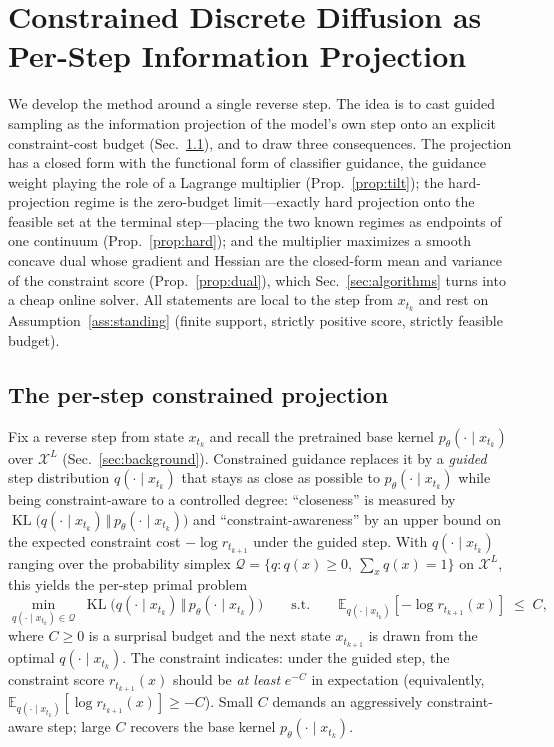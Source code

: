 \documentclass{article}
\DeclareMathOperator{\KL}{KL}
\newcommand{\E}{\mathbb{E}}
\newcommand{\X}{\mathcal{X}}
\newcommand{\Q}{\mathcal{Q}}
\begin{document}
\section{Constrained Discrete Diffusion as Per-Step Information Projection}
\label{sec:method}

We develop the method around a single reverse step. The idea is to cast guided sampling as the information projection of the model's own step onto an explicit constraint-cost budget (Sec.~\ref{sec:perstep}), and to draw three consequences. The projection has a closed form with the functional form of classifier guidance, the guidance weight playing the role of a Lagrange multiplier (Prop.~\ref{prop:tilt}); the hard-projection regime is the zero-budget limit---exactly hard projection onto the feasible set at the terminal step---placing the two known regimes as endpoints of one continuum (Prop.~\ref{prop:hard}); and the multiplier maximizes a smooth concave dual whose gradient and Hessian are the closed-form mean and variance of the constraint score (Prop.~\ref{prop:dual}), which Sec.~\ref{sec:algorithms} turns into a cheap online solver. All statements are local to the step from $x_{t_k}$ and rest on Assumption~\ref{ass:standing} (finite support, strictly positive score, strictly feasible budget).

\subsection{The per-step constrained projection}
\label{sec:perstep}
Fix a reverse step from state $x_{t_k}$ and recall the pretrained base kernel $p_\theta(\cdot\mid x_{t_k})$ over $\X^L$ (Sec.~\ref{sec:background}). Constrained guidance replaces it by a \emph{guided} step distribution $q(\cdot\mid x_{t_k})$ that stays as close as possible to $p_\theta(\cdot\mid x_{t_k})$ while being constraint-aware to a controlled degree: ``closeness'' is measured by $\KL\big(q(\cdot\mid x_{t_k})\,\Vert\,p_\theta(\cdot\mid x_{t_k})\big)$ and ``constraint-awareness'' by an upper bound on the expected constraint cost $-\log r_{t_{k+1}}$ under the guided step. With $q(\cdot\mid x_{t_k})$ ranging over the probability simplex $\Q=\{q:q(x)\ge0,\ \sum_x q(x)=1\}$ on $\X^L$, this yields the per-step primal problem
\begin{equation}
\label{eq:primal}
\min_{q(\cdot\mid x_{t_k})\in\Q}\; \KL\big(q(\cdot\mid x_{t_k})\,\big\Vert\, p_\theta(\cdot\mid x_{t_k})\big)
\qquad\text{s.t.}\qquad
\E_{q(\cdot\mid x_{t_k})}\!\left[-\log r_{t_{k+1}}(x)\right]\;\le\;C,
\end{equation}
where $C\ge 0$ is a surprisal budget and the next state $x_{t_{k+1}}$ is drawn from the optimal $q(\cdot\mid x_{t_k})$. The constraint indicates: under the guided step, the constraint score $r_{t_{k+1}}(x)$ should be \emph{at least} $e^{-C}$ in expectation (equivalently, $\E_{q(\cdot\mid x_{t_k})}[\log r_{t_{k+1}}(x)]\ge -C$). Small $C$ demands an aggressively constraint-aware step; large $C$ recovers the base kernel $p_\theta(\cdot\mid x_{t_k})$.
\end{document}
